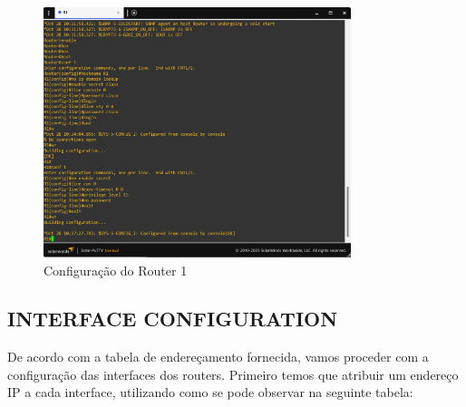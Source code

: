 \documentclass[11pt,english, openright, oneside]{book}
\begin{document}
\begin{figure}[H]
    \centering
    \includegraphics[width=0.8\textwidth]{imagens/Tarefa1/1.init_conf.png}
    \caption{Configuração do Router 1}
    \label{fig:config1}
\end{figure}

\newpage
\subsection{INTERFACE CONFIGURATION}
\vspace{0.2cm}

De acordo com a tabela de endereçamento fornecida, vamos proceder com a configuração das interfaces dos routers. Primeiro temos que atribuir um endereço IP a cada interface, utilizando como se pode observar na seguinte tabela:
\end{document}
